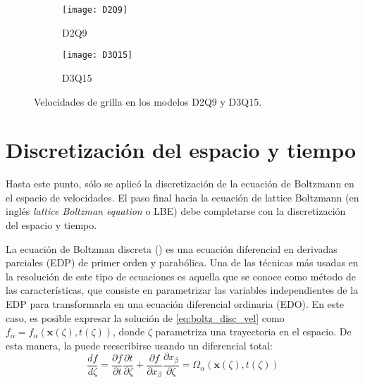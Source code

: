 \begin{figure}[ht]
	\centering
    \begin{subfigure}[t]{0.45\textwidth}
        \centering
        \texttt{[image: D2Q9]}
        \caption{D2Q9}
    \end{subfigure}
    \begin{subfigure}[t]{0.45\textwidth}
        \centering
        \texttt{[image: D3Q15]}
        \caption{D3Q15}
    \end{subfigure}    	
	\caption{Velocidades de grilla en los modelos D2Q9 y D3Q15.}
	\label{fig:DdQq}
\end{figure}
\FloatBarrier


\section{Discretizaci\'on del espacio y tiempo}  
Hasta este punto, s\'olo se aplic\'o la discretizaci\'on de la ecuaci\'on de Boltzmann en el espacio de velocidades. El paso final hacia la ecuaci\'on de lattice Boltzmann (en ingl\'es \emph{lattice Boltzman equation} o LBE) debe completarse con la discretizaci\'on del espacio y tiempo.
\par 
La ecuaci\'on de Boltzman discreta () es una ecuaci\'on diferencial en derivadas parciales (EDP) de primer orden y parab\'olica. Una de las t\'ecnicas m\'as usadas en la resoluci\'on de este tipo de ecuaciones es aquella que se conoce como m\'etodo de las caracter\'isticas, que consiste en parametrizar las variables independientes de la EDP para transformarla en una ecuaci\'on diferencial ordinaria (EDO). En este caso, es posible expresar la soluci\'on de \ref{eq:boltz_disc_vel} como $f_{\alpha}=f_{\alpha}(\bm{x}(\zeta),t(\zeta))$, donde $\zeta$ parametriza una trayectoria en el espacio. De esta manera, la  puede reescribirse usando un diferencial total:
\begin{equation}
	\dfrac{df}{d\zeta} = \dfrac{\partial f}{\partial t}\dfrac{\partial t}{\partial \zeta} + \dfrac{\partial f}{\partial x_{\beta}}\dfrac{\partial x_{\beta}}{\partial \zeta} = \Omega_{\alpha}(\bm{x}(\zeta),t(\zeta))
	\label{eq:zeta_total}
\end{equation}


